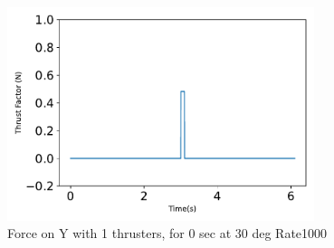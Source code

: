 \begin{figure}[htbp]\centerline{\includegraphics[width=0.8\textwidth]{AutoTeX/Force_1Thrusters_0s_30deg_Loc2_Rate1000}}\caption{Force on Y with 1 thrusters, for 0 sec at 30 deg Rate1000}\label{fig:Force_1Thrusters_0s_30deg_Loc2_Rate1000}\end{figure}